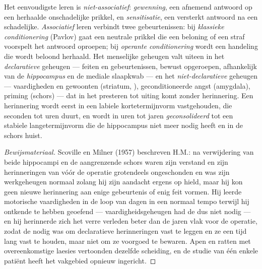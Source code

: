 \begin{definition}\label{def:b3:learning-memory:kinds}
Het eenvoudigste leren is \emph{niet-associatief}: \emph{gewenning},
een afnemend antwoord op een herhaalde onschadelijke prikkel, en
\emph{sensitisatie}, een versterkt antwoord na een schadelijke.
\emph{Associatief} leren verbindt twee gebeurtenissen: bij
\emph{klassieke conditionering} (Pavlov) gaat een neutrale prikkel die
een beloning of een straf voorspelt het antwoord oproepen; bij
\emph{operante conditionering} wordt een handeling die wordt beloond
herhaald. Het menselijke geheugen valt uiteen in het
\emph{declaratieve} geheugen --- feiten en gebeurtenissen, bewust
opgeroepen, afhankelijk van de \emph{hippocampus} en de mediale
slaapkwab --- en het \emph{niet-declaratieve} geheugen ---
vaardigheden en gewoonten (striatum, ),
geconditioneerde angst (amygdala), priming (schors) --- dat in het
presteren tot uiting komt zonder herinnering. Een herinnering wordt
eerst in een labiele kortetermijnvorm vastgehouden, die seconden tot
uren duurt, en wordt in uren tot jaren \emph{geconsolideerd} tot een
stabiele langetermijnvorm die de hippocampus niet meer nodig heeft en
in de schors huist.
\end{definition}

\begin{proof}[Bewijsmateriaal]
Scoville en Milner (1957) beschreven H.M.: na verwijdering van beide
hippocampi en de aangrenzende schors waren zijn verstand en zijn
herinneringen van vóór de operatie grotendeels ongeschonden en was zijn
werkgeheugen normaal zolang hij zijn aandacht ergens op hield, maar hij
kon geen nieuwe herinnering aan enige gebeurtenis of enig feit vormen.
Hij leerde motorische vaardigheden in de loop van dagen in een normaal
tempo terwijl hij ontkende te hebben geoefend --- vaardigheidsgeheugen
had de  dus niet nodig --- en hij herinnerde zich het verre
verleden beter dan de jaren vlak voor de operatie, zodat de 
nodig was om declaratieve herinneringen vast te leggen en ze een tijd
lang vast te houden, maar niet om ze voorgoed te bewaren. Apen en
ratten met overeenkomstige laesies vertoonden dezelfde scheiding, en de
studie van één enkele patiënt heeft het vakgebied opnieuw ingericht.
\end{proof}

